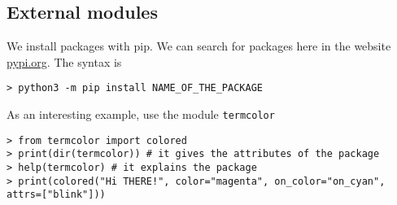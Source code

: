 \subsection{External modules}

We install packages with pip. We can search for packages here in the website \href{https://pypi.org/search/}{pypi.org}. The syntax is 
\begin{verbatim}
> python3 -m pip install NAME_OF_THE_PACKAGE
\end{verbatim}

As an interesting example, use the module \verb|termcolor|
\begin{verbatim}
> from termcolor import colored
> print(dir(termcolor)) # it gives the attributes of the package
> help(termcolor) # it explains the package
> print(colored("Hi THERE!", color="magenta", on_color="on_cyan", attrs=["blink"]))
\end{verbatim}